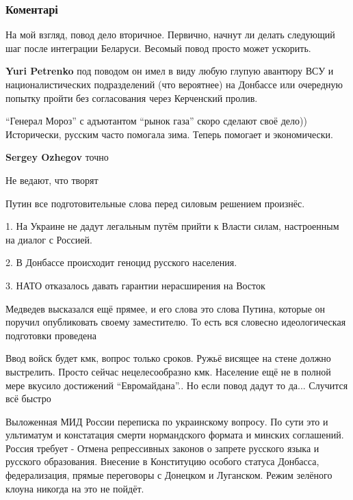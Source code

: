 
 
 
 
 
\subsubsection{Коментарі}

\begin{itemize} %
На мой взгляд, повод дело вторичное. Первично, начнут ли делать следующий шаг после интеграции Беларуси. Весомый повод просто может ускорить.


\textbf{Yuri Petrenko} под поводом он имел в виду любую глупую авантюру ВСУ и националистических подразделений (что вероятнее) на Донбассе или очередную попытку пройти без согласования через Керченский пролив.

\enquote{Генерал Мороз} с адъютантом \enquote{рынок газа} скоро сделают своё дело))
Исторически, русским часто помогала зима.
Теперь помогает и экономически.

\textbf{Sergey Ozhegov} точно

Не ведают, что творят


Путин все подготовительные слова перед силовым решением произнёс.

1. На Украине не дадут легальным путём прийти к Власти силам, настроенным на
диалог с Россией.

2. В Донбассе происходит геноцид русского населения.

3. НАТО отказалось давать гарантии нерасширения на Восток

Медведев высказался ещё прямее, и его слова это слова Путина, которые он
поручил опубликовать своему заместителю.  То есть вся словесно идеологическая
подготовки проведена

Ввод войск будет кмк, вопрос только сроков.
Ружьё висящее на стене должно выстрелить.
Просто сейчас нецелесообразно кмк.
Население ещё не в полной мере вкусило достижений \enquote{Евромайдана}..
Но если повод дадут то да... Случится всё быстро

Выложенная МИД России переписка по украинскому вопросу.
По сути это и ультиматум и констатация смерти нормандского формата и минских соглашений.
Россия требует -
Отмена репрессивных законов о запрете русского языка и русского образования. Внесение в Конституцию особого статуса Донбасса, федерализация, прямые переговоры с Донецком и Луганском.
Режим зелёного клоуна никогда на это не пойдёт.

\end{itemize} %
